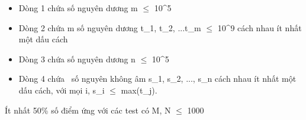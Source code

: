 \begin{itemize}
	\item     Dòng 1 chứa số nguyên dương m  $\le$  10^5   
	\item     Dòng 2 chứa m số nguyên dương t\_1, t\_2, ...t\_m  $\le$  10^9 cách nhau ít nhất một dấu cách   
	\item     Dòng 3 chứa số nguyên dương n  $\le$  10^5   
	\item     Dòng 4 chứa     số nguyên không âm s\_1, s\_2, ..., s\_n cách nhau ít nhất một dấu cách, với mọi i, s\_i  $\le$  max(t\_j).   
\end{itemize}

Ít nhất 50\% số điểm ứng với các test có M, N  $\le$  1000